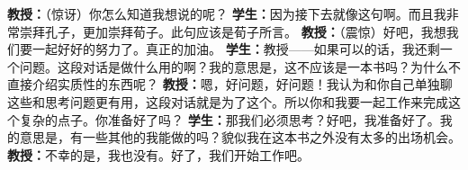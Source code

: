 \textbf{教授：}（惊讶）你怎么知道我想说的呢？\newline
\textbf{学生：}因为接下去就像这句啊。而且我非常崇拜孔子，更加崇拜荀子。此句应该是荀子所言。\newline
\textbf{教授：}（震惊）好吧，我想我们要一起好好的努力了。真正的加油。\newline
\textbf{学生：}教授——如果可以的话，我还剩一个问题。这段对话是做什么用的啊？我的意思是，这不应该是一本书吗？为什么不直接介绍实质性的东西呢？\newline
\textbf{教授：}嗯，好问题，好问题！我认为和你自己单独聊这些和思考问题更有用，这段对话就是为了这个。所以你和我要一起工作来完成这个复杂的点子。你准备好了吗？\newline
\textbf{学生：}那我们必须思考？好吧，我准备好了。我的意思是，有一些其他的我能做的吗？貌似我在这本书之外没有太多的出场机会。\newline
\textbf{教授：}不幸的是，我也没有。好了，我们开始工作吧。